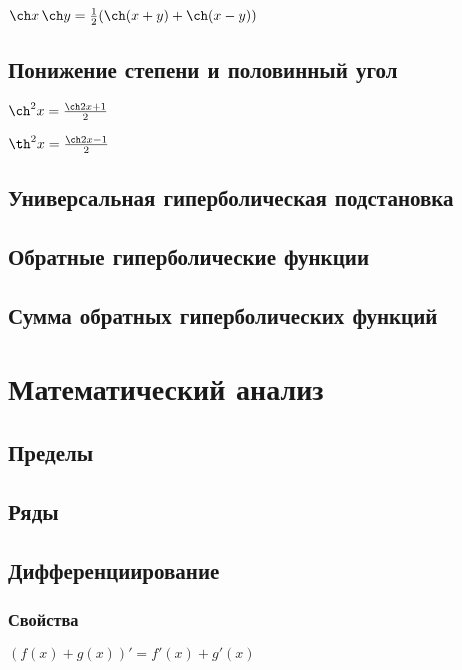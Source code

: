 $ \ch x \, \ch y = \frac12(\ch(x+y)+\ch(x-y)) $

\subsection{Понижение степени и половинный угол}

$ \ch^2 x = \frac{\ch 2x+1}{2} $

$ \th^2 x = \frac{\ch 2x-1}{2} $ 

\subsection{Универсальная гиперболическая подстановка}



\subsection{Обратные гиперболические функции}

\subsection{Сумма обратных гиперболических функций}


\section{Математический анализ}

\subsection{Пределы}

\subsection{Ряды}

\subsection{Дифференциирование}

\subsubsection{Свойства}

$ (f(x) + g(x))' = f'(x) + g'(x) $

